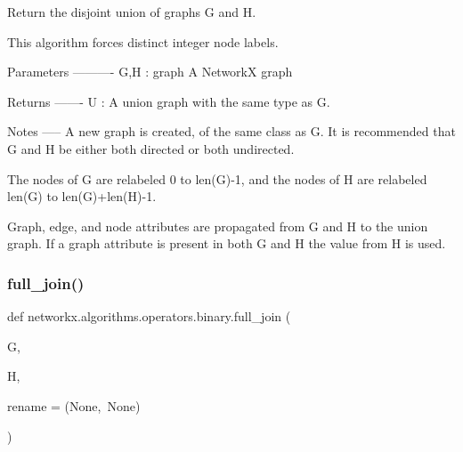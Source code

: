\begin{DoxyVerb}Return the disjoint union of graphs G and H.

This algorithm forces distinct integer node labels.

Parameters
----------
G,H : graph
   A NetworkX graph

Returns
-------
U : A union graph with the same type as G.

Notes
-----
A new graph is created, of the same class as G.  It is recommended
that G and H be either both directed or both undirected.

The nodes of G are relabeled 0 to len(G)-1, and the nodes of H are
relabeled len(G) to len(G)+len(H)-1.

Graph, edge, and node attributes are propagated from G and H
to the union graph.  If a graph attribute is present in both
G and H the value from H is used.
\end{DoxyVerb}
 \mbox{\label{namespacenetworkx_1_1algorithms_1_1operators_1_1binary_a4ccd668d718078b0f4578e55274e590f}} 
\subsubsection{\texorpdfstring{full\+\_\+join()}{full\_join()}}
{\footnotesize\ttfamily def networkx.\+algorithms.\+operators.\+binary.\+full\+\_\+join (\begin{DoxyParamCaption}\item[{}]{G,  }\item[{}]{H,  }\item[{}]{rename = {\ttfamily (None,~None)} }\end{DoxyParamCaption})}

